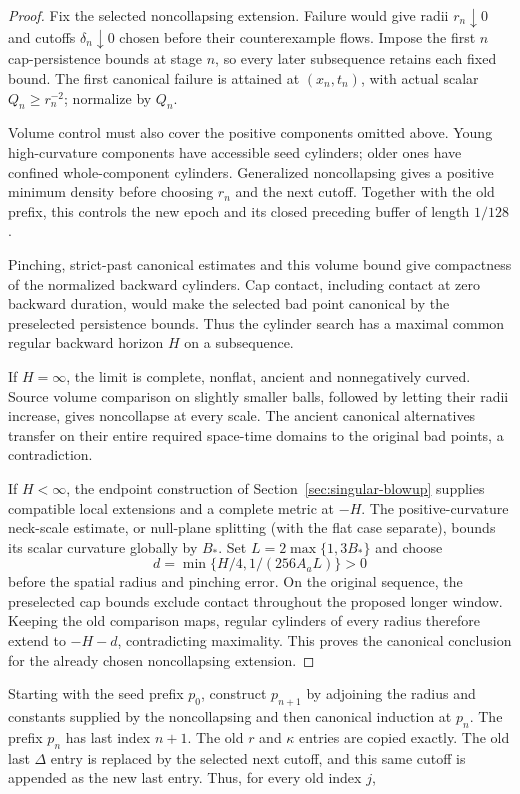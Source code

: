 \begin{proof}
Fix the selected noncollapsing extension. Failure would give radii
$r_n\downarrow0$ and cutoffs $\delta_n\downarrow0$ chosen before their
counterexample flows. Impose the first $n$ cap-persistence bounds at stage
$n$, so every later subsequence retains each fixed bound. The first
canonical failure is attained at $(x_n,t_n)$, with actual scalar
$Q_n\geq r_n^{-2}$; normalize by $Q_n$.

Volume control must also cover the positive components omitted above.
Young high-curvature components have accessible seed cylinders; older ones
have confined whole-component cylinders. Generalized noncollapsing gives
a positive minimum density before choosing $r_n$ and the next cutoff.
Together with the old prefix, this controls the new epoch and its closed
preceding buffer of length $1/128$.

Pinching, strict-past canonical estimates and this volume bound give
compactness of the normalized backward cylinders. Cap contact, including
contact at zero backward duration, would make the selected bad point
canonical by the preselected persistence bounds. Thus the cylinder search
has a maximal common regular backward horizon $H$ on a subsequence.

If $H=\infty$, the limit is complete, nonflat, ancient and nonnegatively
curved. Source volume comparison on slightly smaller balls, followed by
letting their radii increase, gives noncollapse at every scale. The ancient
canonical alternatives transfer on their entire required space-time
domains to the original bad points, a contradiction.

If $H<\infty$, the endpoint construction of
Section~\ref{sec:singular-blowup} supplies compatible local extensions and
a complete metric at $-H$. The positive-curvature neck-scale estimate,
or null-plane splitting (with the flat case separate), bounds its scalar
curvature globally by $B_*$. Set $L=2\max\{1,3B_*\}$ and choose
\[
 d=\min\{H/4,1/(256A_aL)\}>0
\]
before the spatial radius and pinching error. On the original sequence,
the preselected cap bounds exclude contact throughout the proposed longer
window. Keeping the old comparison maps, regular cylinders of every radius
therefore extend to $-H-d$, contradicting maximality. This proves the
canonical conclusion for the already chosen noncollapsing extension.
\end{proof}

Starting with the seed prefix $p_0$, construct $p_{n+1}$ by adjoining
the radius and constants supplied by the noncollapsing and then canonical
induction at $p_n$. The prefix $p_n$ has last index $n+1$.
The old $r$ and $\kappa$ entries are copied exactly. The old last
$\Delta$ entry is replaced by the selected next cutoff, and this same
cutoff is appended as the new last entry. Thus, for every old index $j$,

